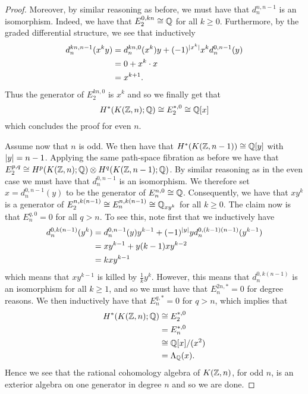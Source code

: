\documentclass[../main.tex]{subfiles}
\begin{document}
\begin{proof}
Moreover, by similar reasoning as before, we must have that \( d^{n, n-1}
_n\) is an isomorphism. Indeed, we have that \( E^{0, kn}_2 \cong\mathbb{Q} \) 
for all \( k\geq 0 \). Furthermore, by the graded differential
structure, we see that inductively
\begin{align*}
    d_n^{kn, n-1}(x^k y)&= d_n^{kn, 0}(x^k)y + (-1)^{\lvert x^k\rvert}x^k d_n^{0, n-1}(y) \\
              &= 0 + x^k\cdot x \\
              &= x^{k+1}.
\end{align*}
Thus the generator of \( E_2^{kn, 0} \) is \( x^k \) and so we finally
get that
\begin{equation}
    H^*(K(\mathbb{Z}, n);\mathbb{Q})\cong E^{*, 0}_2 \cong \mathbb{Q}[x]
\end{equation}
which concludes the proof for even \( n \).

Assume now that \( n \) is odd. We then have that \( H^*(K(\mathbb{Z},n-1))\cong
\mathbb{Q}[y]\) with \( \lvert y\rvert=n-1 \). Applying the same path-space fibration as before we have that
\( E_2^{p, q}\cong H^p(K(\mathbb{Z}, n);\mathbb{Q})\otimes H^q(K(\mathbb{Z}, n-1); \mathbb{Q})\). By
similar reasoning as in the even case we must have that \( d_n^{0, n-1} \)
is an isomorphism. We therefore set \( x=d^{0, n-1}_n(y) \) to be the
generator of \( E_n^{n, 0}\cong\mathbb{Q} \). Consequently, we have that
\( xy^k \) is a generator of \( E_2^{n, k(n-1)}\cong E_n^{n, k(n-1)}\cong
\mathbb{Q}_{xy^k}\) for all \( k\geq 0 \). The claim now is that
\( E_n^{q, 0}=0 \) for all \( q>n \). To see this, note first that
we inductively have
\begin{align*}
    d_n^{0, k(n-1)}(y^k)&=d_n^{0, n-1}(y)y^{k-1}+(-1)^{\lvert y\rvert}yd_n^{0, (k-1)(n-1)}(y^{k-1})\\
    &= xy^{k-1} +y(k-1)xy^{k-2} \\
    &= kxy^{k-1}
\end{align*}
which means that \( xy^{k-1} \) is killed by \( \frac{1}{k}y^k \).
However, this means that \( d^{0, k(n-1)}_n \) is an isomorphism
for all \( k \geq 1 \), and so we must have that \( E_n^{2n, *}=0 \) for
degree reasons. We then inductively have that \( E_n^{q, *}=0 \) for
\( q>n \), which
implies that
\begin{align*}
    H^*(K(\mathbb{Z}, n);\mathbb{Q})&\cong E_2^{*, 0}\\
                    &=E_n^{*, 0}\\
                    &\cong\mathbb{Q}[x]/(x^2) \\
                    &= \Lambda_{\mathbb{Q}}(x).
\end{align*}
Hence we see that the rational cohomology algebra of \( K(\mathbb{Z}, n) \), for
odd \( n \), is an exterior algebra on one generator in degree \( n \)
and so we are done.
\end{proof}
\end{document}
